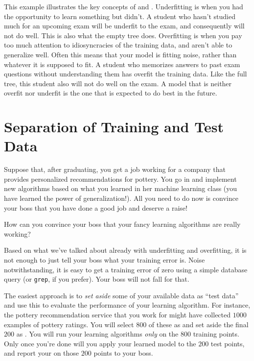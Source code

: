 
This example illustrates the key concepts of 
and .  Underfitting is when you had the
opportunity to learn something but didn't.  A student who hasn't
studied much for an upcoming exam will be underfit to the exam, and
consequently will not do well.  This is also what the empty tree
does.  Overfitting is when you pay too much attention to
idiosyncracies of the training data, and aren't able to generalize
well.  Often this means that your model is fitting noise, rather than
whatever it is supposed to fit.  A student who memorizes answers to
past exam questions without understanding them has overfit the
training data.  Like the full tree, this student also will not do well
on the exam.  A model that is neither overfit nor underfit is the one
that is expected to do best in the future.

\section{Separation of Training and Test Data}

Suppose that, after graduating, you get a job working for a company
that provides personalized recommendations for pottery.  You go in and
implement new algorithms based on what you learned in her machine
learning class (you have learned the power of generalization!).  All
you need to do now is convince your boss that you have done a good job
and deserve a raise!

How can you convince your boss that your fancy learning algorithms are
really working?

Based on what we've talked about already with underfitting and
overfitting, it is not enough to just tell your boss what your
training error is.  Noise notwithstanding, it is easy to get a
training error of zero using a simple database query (or {\tt grep},
if you prefer).  Your boss will not fall for that.

The easiest approach is to \emph{set aside} some of your available
data as ``test data'' and use this to evaluate the performance of your
learning algorithm.  For instance, the pottery recommendation service
that you work for might have collected $1000$ examples of pottery
ratings.  You will select $800$ of these as 
and set aside the final $200$ as .  You will run
your learning algorithms \emph{only} on the $800$ training points.
Only once you're done will you apply your learned model to the $200$
test points, and report your  on those $200$
points to your boss.

